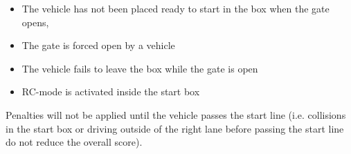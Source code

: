 \begin{itemize}
	\item The vehicle has not been placed ready to start in the box when the gate opens,
	\item The gate is forced open by a vehicle

	\item The vehicle fails to leave the box while the gate is open

	\item RC-mode is activated inside the start box
\end{itemize}

Penalties will not be applied until the vehicle passes the start line (i.e.
collisions in the start box or driving outside of the right lane before passing
the start line do not reduce the overall score).

%
%
